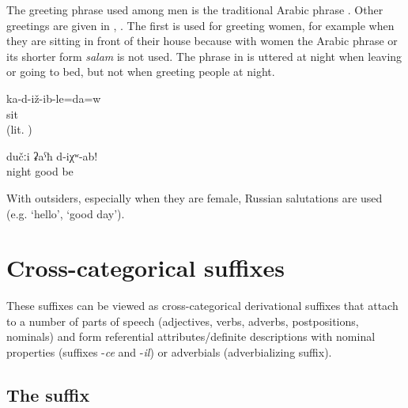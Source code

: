 The greeting phrase used among men is the traditional Arabic phrase . Other greetings are given in , . The first is used for greeting women, for example when they are sitting in front of their house because with women the Arabic phrase or its shorter form \textit{salam} is not used. The phrase in  is uttered at night when leaving or going to bed, but not when greeting people at night. 
%
\begin{exe}
	\ex	\label{ex:Are you sitting minor}
	\gll	ka-d-iž-ib-le=da=w\\
		sit\\
	\glt	{} (lit. )

	\ex	\label{ex:‎‎‎Good night minor}
	\gll	dučːi	ʡaˁħ	d-iχʷ-ab!\\
		night	good	be\\
	\glt	{}
\end{exe}

With outsiders, especially when they are female, Russian salutations are used (e.g.  `hello',  `good day').





\section{Cross-categorical suffixes}
\label{sec:Cross-categorical derivational suffixes}

These suffixes can be viewed as cross-categorical derivational suffixes that attach to a number of parts of speech (adjectives, verbs, adverbs, postpositions, nominals) and form referential attributes\slash definite descriptions with nominal properties (suffixes -\textit{ce} and -\textit{il}) or adverbials (adverbializing suffix).


\subsection{The suffix  }
\label{ssec:The -ce / -te attributive}
